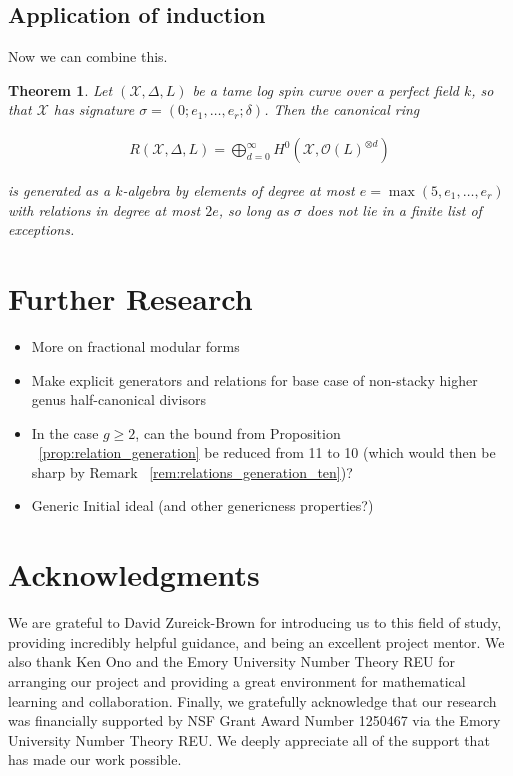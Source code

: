 \documentclass{amsart}
\theoremstyle{plain}
\newtheorem{thm}{Theorem}[section]
\theoremstyle{definition}
\theoremstyle{remark}
\numberwithin{equation}{section}
\newcommand\ssec{\subsection}
\newcommand \sx{\mathscr X}
\newcommand\sco{{\mathscr O}}
\begin{document}
\ssec{Application of induction}
\label{ssec:g_0_noneff_induction}
Now we can combine this.

\begin{thm}
\label{thm:g_0_generators_relations_rep}
Let $(\sx, \Delta, L)$ be a tame log spin curve over a perfect field $k$, so
that $\sx$ has signature $\sigma = (0; e_1, \ldots, e_r; \delta)$. Then the
canonical ring

\begin{align*}
	R(\sx, \Delta, L) = \bigoplus_{d = 0}^\infty H^0(\sx, \sco(L)^{\otimes d})
\end{align*}

\noindent
is generated as a $k$-algebra by elements of degree at most $e = 
\max(5,e_1,\ldots, e_r)$ with relations in degree at most $2e$, so 
long as $\sigma$ does not lie in a finite list of exceptions. 
\end{thm}

\section{Further Research}
\begin{itemize}
	\item More on fractional modular forms
	\item Make explicit generators and relations for base case of non-stacky higher genus half-canonical divisors
	\item In the case $g \geq 2$, can the bound from Proposition ~\ref{prop:relation_generation} be reduced from 11 to 10 (which would then be sharp by Remark ~\ref{rem:relations_generation_ten})?  
	\item Generic Initial ideal (and other genericness properties?)
\end{itemize}


\section{Acknowledgments}
We are grateful to David Zureick-Brown for introducing us to this
field of study, providing incredibly helpful guidance, and being an
excellent project mentor. We also thank Ken Ono and the Emory University
Number Theory REU for arranging our project and providing a great
environment for mathematical learning and collaboration. Finally, we
gratefully acknowledge that our research was financially supported by
NSF Grant Award Number 1250467 via the Emory University Number Theory REU.
We deeply appreciate all of the support that has made our work possible.


\nocite{*}
{}

\end{document}
